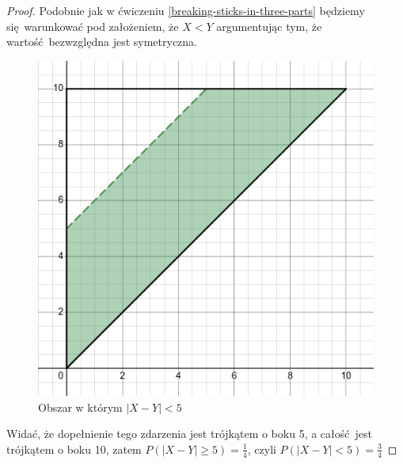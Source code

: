 \begin{proof}
    Podobnie jak w ćwiczeniu \ref{breaking-sticks-in-three-parts} będziemy się warunkować pod założeniem, że \( X < Y \) argumentując tym, że wartość bezwzględna jest symetryczna.
    
    \begin{figure}[H]
        \centering
        \includegraphics[scale=0.5]{img/continuous probability/distance-of-two-uniform-variables.png}
        \caption{Obszar w którym \( |X - Y| < 5\) }
    \end{figure}
    
    Widać, że dopełnienie tego zdarzenia jest trójkątem o boku 5, a całość jest trójkątem o boku 10,
    zatem \( P(|X - Y| \geq 5) = \frac{1}{4} \), czyli \( P(|X - Y| < 5) = \frac{3}{4} \)
\end{proof}
